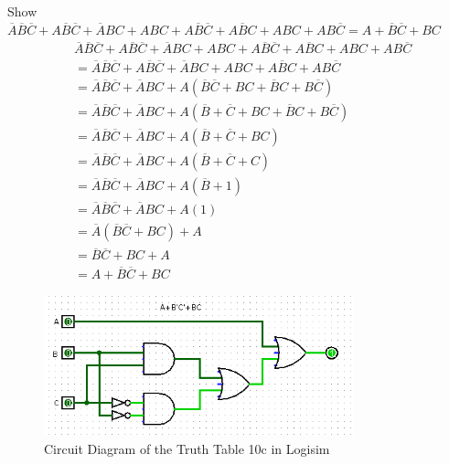 \documentclass[12pt]{article}
\begin{document}
\begin{enumerate}
\begin{enumerate}
      Show $\overline{A}\overline{B}\overline{C} + A\overline{B}\overline{C} + \overline{A}BC + ABC + A\overline{B}\overline{C} + A\overline{B}C + ABC + AB\overline{C} = A + \overline{B}\overline{C} + BC$
      \begin{align*}
        &\overline{A}\overline{B}\overline{C} + A\overline{B}\overline{C} + \overline{A}BC + ABC + A\overline{B}\overline{C} + A\overline{B}C + ABC + AB\overline{C}\\
        &=\overline{A}\overline{B}\overline{C} + A\overline{B}\overline{C} + \overline{A}BC + ABC + A\overline{B}C + AB\overline{C}\\
        &=\overline{A}\overline{B}\overline{C} + \overline{A}BC + A(\overline{B}\overline{C} + BC + \overline{B}C + B\overline{C})\\
        &=\overline{A}\overline{B}\overline{C} + \overline{A}BC + A(\overline{B} + \overline{C} + BC + \overline{B}C + B\overline{C})\\
        &=\overline{A}\overline{B}\overline{C} + \overline{A}BC + A(\overline{B} + \overline{C} + BC)\\
        &=\overline{A}\overline{B}\overline{C} + \overline{A}BC + A(\overline{B} + \overline{C} + C)\\
        &=\overline{A}\overline{B}\overline{C} + \overline{A}BC + A(\overline{B} + 1)\\
        &=\overline{A}\overline{B}\overline{C} + \overline{A}BC + A(1)\\
        &=\overline{A}(\overline{B}\overline{C} + BC) + A\\
        &=\overline{B}\overline{C} + BC + A\\
        &=A + \overline{B}\overline{C} + BC
      \end{align*}

      \begin{figure}[h]
        \centering
        \includegraphics[width=0.8\textwidth]{assn/02/media/10c.png}
        \caption{Circuit Diagram of the Truth Table 10c in Logisim}
      \end{figure}

    \end{enumerate}

  \end{enumerate}
\end{document}
